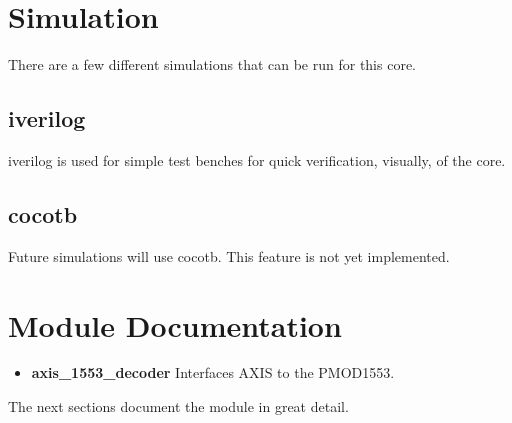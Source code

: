 \newpage

\section{Simulation}
\par
There are a few different simulations that can be run for this core.

\subsection{iverilog}
\par
iverilog is used for simple test benches for quick verification, visually, of the core.

\subsection{cocotb}
\par
Future simulations will use cocotb. This feature is not yet implemented.

\newpage

\section{Module Documentation} \label{Module Documentation}

\begin{itemize}
\item \textbf{axis\_1553\_decoder} Interfaces AXIS to the PMOD1553.\\
\end{itemize}
The next sections document the module in great detail.


